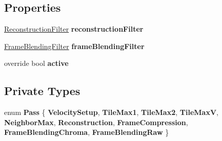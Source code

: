 \subsection*{Properties}
\begin{DoxyCompactItemize}
\item 
\mbox{\label{class_unity_engine_1_1_post_processing_1_1_motion_blur_component_aea13feeae21a2323a05a78650f761594}} 
\hyperlink{class_unity_engine_1_1_post_processing_1_1_motion_blur_component_1_1_reconstruction_filter}{Reconstruction\+Filter} {\bfseries reconstruction\+Filter}
\item 
\mbox{\label{class_unity_engine_1_1_post_processing_1_1_motion_blur_component_a21f0734301f3bd60e1454df1540c3a79}} 
\hyperlink{class_unity_engine_1_1_post_processing_1_1_motion_blur_component_1_1_frame_blending_filter}{Frame\+Blending\+Filter} {\bfseries frame\+Blending\+Filter}
\item 
\mbox{\label{class_unity_engine_1_1_post_processing_1_1_motion_blur_component_aef85ae6ce557465b097ed27e23f0a27e}} 
override bool {\bfseries active}
\end{DoxyCompactItemize}
\subsection*{Private Types}
\begin{DoxyCompactItemize}
\item 
\mbox{\label{class_unity_engine_1_1_post_processing_1_1_motion_blur_component_acd834d7220d121f6270f964a1891dc72}} 
enum {\bfseries Pass} \{ \newline
{\bfseries Velocity\+Setup}, 
{\bfseries Tile\+Max1}, 
{\bfseries Tile\+Max2}, 
{\bfseries Tile\+MaxV}, 
\newline
{\bfseries Neighbor\+Max}, 
{\bfseries Reconstruction}, 
{\bfseries Frame\+Compression}, 
{\bfseries Frame\+Blending\+Chroma}, 
\newline
{\bfseries Frame\+Blending\+Raw}
 \}
\end{DoxyCompactItemize}
